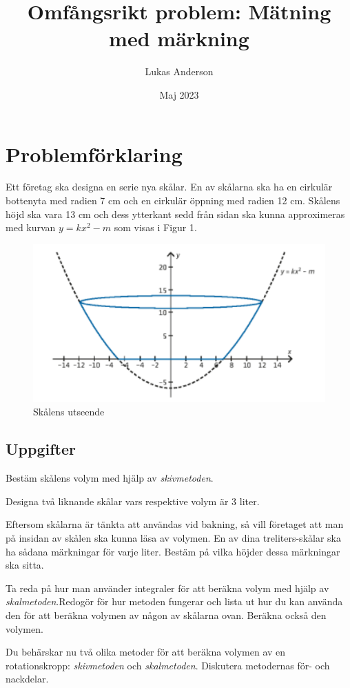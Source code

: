 \documentclass[12pt]{article}
\title{Omfångsrikt problem: Mätning med märkning}
\author{Lukas Anderson}
\date{Maj 2023}
\begin{document}
\maketitle

\section{Problemförklaring}
Ett företag ska designa en serie nya skålar. En av skålarna ska ha en cirkulär bottenyta med radien 7 cm och en cirkulär öppning med radien 12 cm. Skålens höjd ska vara 13 cm och dess ytterkant sedd från sidan ska kunna approximeras med kurvan $y=kx^2-m$ som visas i Figur 1.

\begin{figure}[h]
    \centering
    \includegraphics[width=\textwidth]{figur1.png}
    \caption{Skålens utseende}
\end{figure}

\subsection*{Uppgifter}
\begin{list}{-}{\leftmargin=1em\rightmargin=1em}
    \item Bestäm skålens volym med hjälp av {\it skivmetoden}.
    \item Designa två liknande skålar vars respektive volym är 3 liter.
    \item Eftersom skålarna är tänkta att användas vid bakning, så vill företaget att man på insidan av skålen ska kunna läsa av volymen. En av dina treliters-skålar ska ha sådana märkningar för varje liter. Bestäm på vilka höjder dessa märkningar ska sitta.
    \item Ta reda på hur man använder integraler för att beräkna volym med hjälp av {\it skalmetoden}.Redogör för hur metoden fungerar och lista ut hur du kan använda den för att beräkna volymen av någon av skålarna ovan. Beräkna också den volymen.
    \item Du behärskar nu två olika metoder för att beräkna volymen av en rotationskropp: {\it skivmetoden\/} och {\it skalmetoden}. Diskutera metodernas för- och nackdelar.
\end{list}
\end{document}
